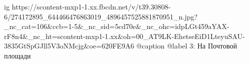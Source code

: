  
 
 
 
 

\ifcmt
  ig https://scontent-mxp1-1.xx.fbcdn.net/v/t39.30808-6/274172895_644466476863019_4896457525881870951_n.jpg?_nc_cat=106&ccb=1-5&_nc_sid=5cd70e&_nc_ohc=idpLGt459aYAX-rF8n4&_nc_ht=scontent-mxp1-1.xx&oh=00_AT9LK-EhetseEiD1LteyuSAU-3835GtSpGJll5V3oNMcjg&oe=620FE9A6
  @caption @label 3: На Почтовой площади
\fi
